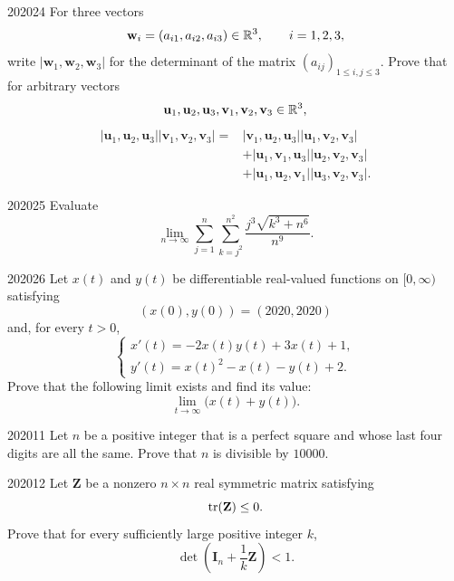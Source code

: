 \begin{problem}{2020}{2}{4}
For three vectors
\[
    \mathbf w_i=(a_{i1}, a_{i2}, a_{i3})\in\mathbb{R}^3,
    \qquad i=1, 2, 3,
\]
write $|\mathbf w_1, \mathbf w_2, \mathbf w_3|$ for the determinant of the matrix $(a_{ij})_{1\le i, j\le3}$. Prove that for arbitrary vectors
\[
    \mathbf u_1, \mathbf u_2, \mathbf u_3,
    \mathbf v_1, \mathbf v_2, \mathbf v_3\in\mathbb{R}^3,
\]
\[
\begin{aligned}
    |\mathbf u_1, \mathbf u_2, \mathbf u_3|
    |\mathbf v_1, \mathbf v_2, \mathbf v_3|
    ={}&
    |\mathbf v_1, \mathbf u_2, \mathbf u_3|
    |\mathbf u_1, \mathbf v_2, \mathbf v_3|\\
    &+|\mathbf u_1, \mathbf v_1, \mathbf u_3|
    |\mathbf u_2, \mathbf v_2, \mathbf v_3|\\
    &+|\mathbf u_1, \mathbf u_2, \mathbf v_1|
    |\mathbf u_3, \mathbf v_2, \mathbf v_3|.
\end{aligned}
\]
\end{problem}

\begin{problem}{2020}{2}{5}
Evaluate
\[
    \lim_{n\to\infty}
    \sum_{j=1}^{n}
    \sum_{k=j^2}^{n^2}
    \frac{j^3\sqrt{k^3+n^6}}{n^9}.
\]
\end{problem}

\begin{problem}{2020}{2}{6}
Let $x(t)$ and $y(t)$ be differentiable real-valued functions on $[0, \infty)$ satisfying
\[
    (x(0), y(0))=(2020, 2020)
\]
and, for every $t>0$,
\[
\begin{cases}
    x'(t)=-2x(t)y(t)+3x(t)+1, \\
    y'(t)=x(t)^2-x(t)-y(t)+2.
\end{cases}
\]
Prove that the following limit exists and find its value:
\[
    \lim_{t\to\infty}\bigl(x(t)+y(t)\bigr).
\]
\end{problem}

\begin{problem}{2020}{1}{1}
Let $n$ be a positive integer that is a perfect square and whose last four digits are all the same. Prove that $n$ is divisible by $10000$.
\end{problem}

\begin{problem}{2020}{1}{2}
Let $\mathbf Z$ be a nonzero $n\times n$ real symmetric matrix satisfying
\[
    \operatorname{tr}(\mathbf Z)\le0.
\]
Prove that for every sufficiently large positive integer $k$,
\[
    \det\left(\mathbf I_n+\frac1k\mathbf Z\right)<1.
\]
\end{problem}

